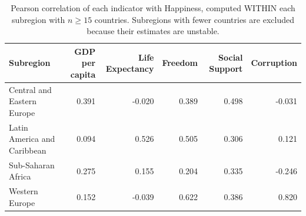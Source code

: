 \begin{table}
\caption{Pearson correlation of each indicator with Happiness, computed WITHIN each subregion with $n \geq 15$ countries. Subregions with fewer countries are excluded because their estimates are unstable.}
\label{tab:corr-subregion}
\begin{tabular}{lrrrrr}
\toprule
Subregion & GDP per capita & Life Expectancy & Freedom & Social Support & Corruption \\
\midrule
Central and Eastern Europe & 0.391 & -0.020 & 0.389 & 0.498 & -0.031 \\
Latin America and Caribbean & 0.094 & 0.526 & 0.505 & 0.306 & 0.121 \\
Sub-Saharan Africa & 0.275 & 0.155 & 0.204 & 0.335 & -0.246 \\
Western Europe & 0.152 & -0.039 & 0.622 & 0.386 & 0.820 \\
\bottomrule
\end{tabular}
\end{table}
